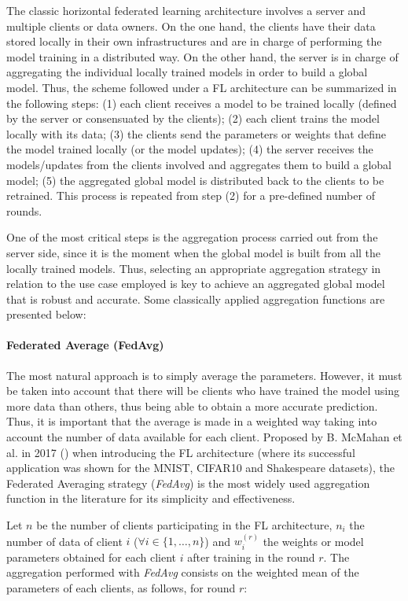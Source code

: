 \documentclass[5p,times]{elsarticle}
\begin{document}
The classic horizontal federated learning architecture involves a server and multiple clients or data owners. On the one hand, the clients have their data stored locally in their own infrastructures and are in charge of performing the model training in a distributed way. On the other hand, the server is in charge of aggregating the individual locally trained models in order to build a global model. Thus, the scheme followed under a FL architecture can be summarized in the following steps: (1) each client receives a model to be trained locally (defined by the server or consensuated by the clients); (2) each client trains the model locally with its data; (3) the clients send the parameters or weights that define the model trained locally (or the model updates); (4) the server receives the models/updates from the clients involved and aggregates them to build a global model; (5) the aggregated global model is distributed back to the clients to be retrained. This process is repeated from step (2) for a pre-defined number of rounds. 

One of the most critical steps is the aggregation process carried out from the server side, since it is the moment when the global model is built from all the locally trained models.
Thus, selecting an appropriate aggregation strategy in relation to the use case employed is key to achieve an aggregated global model that is robust and accurate. Some classically applied aggregation functions are presented below:

\paragraph{Federated Average (FedAvg)}

The most natural approach is to simply average the parameters. However, it must be taken into account that there will be clients who have trained the model using more data than others, thus being able to obtain a more accurate prediction. Thus, it is important that the average is made in a weighted way taking into account the number of data available for each client. Proposed by B. McMahan et al. in 2017 (\cite{mcmahan2017communication}) when introducing the FL architecture (where its successful application was shown for the MNIST, CIFAR10 and Shakespeare datasets), the Federated Averaging strategy (\textit{FedAvg}) is the most widely used aggregation function in the literature for its simplicity and effectiveness. 

Let $n$ be the number of clients  participating in the FL architecture, $n_i$ the number of data of client $i$ ($\forall i \in \{1,\hdots,n\}$) and $w_i^{(r)}$ the weights or model parameters obtained for each client $i$ after training in the round $r$. The aggregation performed with \textit{FedAvg} consists on the weighted mean of the parameters of each clients, as follows, for round $r$:
\end{document}
